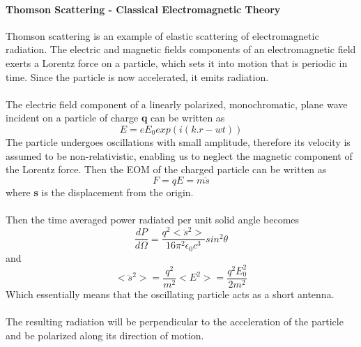 		\paragraph{Thomson Scattering - Classical Electromagnetic Theory}
			Thomson scattering is an example of elastic scattering of electromagnetic radiation. The electric and magnetic fields components of an electromagnetic field exerts a Lorentz force on a particle, which sets it into motion that is periodic in time. Since the particle is now accelerated, it emits radiation.
			\\
			\\
			The electric field component of a linearly polarized, monochromatic, plane wave incident on a particle of charge \textbf{q} can be written as 
			\begin{equation}	E = e E_0 exp(i (k.r - wt))
			\end{equation}
			The particle undergoes oscillations with small amplitude, therefore its velocity is assumed to be non-relativistic, enabling us to neglect the magnetic component of the Lorentz force. Then the EOM of the charged particle can be written as  
			\begin{equation}
				F = q E = m \ddot{s}
			\end{equation}
			where \textbf{s} is the displacement from the origin. 
			\\
			\\
			Then the time averaged power radiated per unit solid angle becomes
			\begin{equation}
				\frac{d P}{d \Omega} = \frac{q^2 <\ddot{s}^2>}{16 \pi^2 \epsilon_0 c^3} sin^2 \theta
			\end{equation}
			and
			\begin{equation}
				<\ddot{s}^2> = \frac{q^2}{m^2} <E^2> = \frac{q^2 E_0^2}{2 m^2}
			\end{equation}
			Which essentially means that the oscillating particle acts as a short antenna.
			\\
			\\
			The resulting radiation will be perpendicular to the acceleration of the particle and be polarized along its direction of motion. 
			\\
